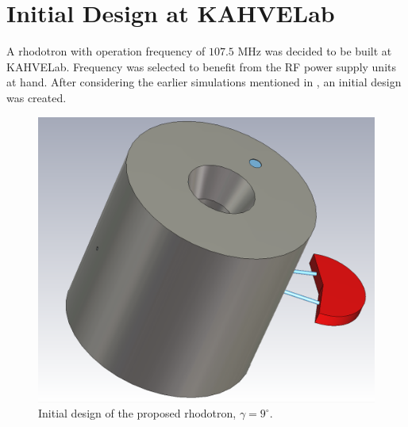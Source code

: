 \documentclass[a4paper,oneside,12pt]{report}
\numberwithin{equation}{chapter}
\begin{document}
\section{Initial Design at KAHVELab} 

A rhodotron with operation frequency of $107.5$ MHz was decided to be built at KAHVELab. 
Frequency was selected to benefit from the RF power supply units at hand.
After considering the earlier simulations mentioned in , an initial design was created.

\vspace{20pt}
\begin{figure}[H]
    \centering
    \includegraphics[width=.7\linewidth]{./figures/cst/cst_first_design1.png}
    \vspace{0pt}
    \caption{Initial design of the proposed rhodotron, $\gamma=9^\circ$.}
    \label{fig:initial_design}
    \vspace{-10pt}
\end{figure}
\end{document}
